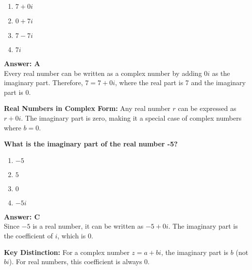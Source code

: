 \documentclass[12pt,a4paper]{article}
\begin{document}
\begin{partbox}[Options]
\begin{enumerate}[label=\Alph*.]
    \item \( 7 + 0i \)
    \item \( 0 + 7i \)
    \item \( 7 - 7i \)
    \item \( 7i \)
\end{enumerate}
\end{partbox}

\begin{answerstyle}
\textbf{Answer: A} \\
Every real number can be written as a complex number by adding \( 0i \) as the imaginary part. Therefore, \( 7 = 7 + 0i \), where the real part is 7 and the imaginary part is 0.
\end{answerstyle}

\begin{conceptbox}
\textbf{Real Numbers in Complex Form:} Any real number \( r \) can be expressed as \( r + 0i \). The imaginary part is zero, making it a special case of complex numbers where \( b = 0 \).
\end{conceptbox}

\newpage
\begin{questiontitle}[MCQ 15]
\textbf{What is the imaginary part of the real number -5?}
\end{questiontitle}

\begin{partbox}[Options]
\begin{enumerate}[label=\Alph*.]
    \item \( -5 \)
    \item \( 5 \)
    \item \( 0 \)
    \item \( -5i \)
\end{enumerate}
\end{partbox}

\begin{answerstyle}
\textbf{Answer: C} \\
Since \( -5 \) is a real number, it can be written as \( -5 + 0i \). The imaginary part is the coefficient of \( i \), which is 0.
\end{answerstyle}

\begin{conceptbox}
\textbf{Key Distinction:} For a complex number \( z = a + bi \), the imaginary part is \( b \) (not \( bi \)). For real numbers, this coefficient is always 0.
\end{conceptbox}
\end{document}
